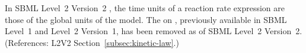 In SBML Level~2 Version~2 , the time units of a reaction
rate expression are those of the global  units of the model.  The
  on \KineticLaw, previously available in SBML
Level~1 and Level~2 Version~1, has been removed as of SBML Level~2
Version~2.  (References: L2V2 Section~\ref{subsec:kinetic-law}.)
